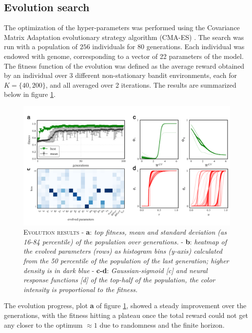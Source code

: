 \subsection{Evolution search}
The optimization of the hyper-parameters was performed using the Covariance Matrix Adaptation evolutionary strategy algorithm (CMA-ES) \cite{igelCovarianceMatrixAdaptation2007}.
The search was run with a population of $256$ individuals for $80$ generations. Each individual was endowed with genome, corresponding to a vector of 22 parameters of the model.
The fitness function of the evolution was defined as the average reward obtained by an individual over 3 different non-stationary bandit environments, each for $K=\{40, 200\}$, and all averaged over 2 iterations.
The results are summarized below in figure \ref{fig:evolution}.

\begin{figure}[H]
    \centering
    \includegraphics[width=1.0\textwidth]{figures/evolution_comp_1.png}
    \caption{\textsc{Evolution results} - \textbf{a}: \textit{top fitness, mean and standard deviation (as 16-84 percentile) of the population over generations.} - \textbf{b}: \textit{heatmap of the evolved parameters (rows) as histogram bins (y-axis) calculated from the 50 percentile of the
    population of the last generation; higher density is in dark blue} - \textbf{c-d}: \textit{Gaussian-sigmoid [c] and neural response functions [d] of the top-half of the population, the color intensity is proportional to the fitness.}}
    \label{fig:evolution}
\end{figure}

\noindent The evolution progress, plot \textbf{a} of figure \ref{fig:evolution}, showed a steady improvement over the generations, with the fitness hitting a plateau once the total reward could not get any closer to the optimum $\approx 1$ due to randomness and the finite horizon.

